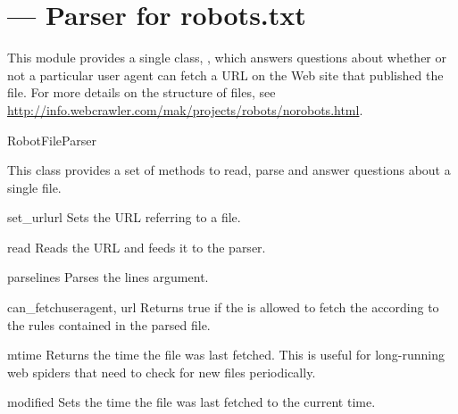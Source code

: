 \section{ --- 
         Parser for robots.txt}



This module provides a single class, , which answers
questions about whether or not a particular user agent can fetch a URL on
the Web site that published the  file.  For more details on 
the structure of  files, see
\url{http://info.webcrawler.com/mak/projects/robots/norobots.html}. 

\begin{classdesc}{RobotFileParser}{}

This class provides a set of methods to read, parse and answer questions
about a single  file.

\begin{methoddesc}{set_url}{url}
Sets the URL referring to a  file.
\end{methoddesc}

\begin{methoddesc}{read}{}
Reads the  URL and feeds it to the parser.
\end{methoddesc}

\begin{methoddesc}{parse}{lines}
Parses the lines argument.
\end{methoddesc}

\begin{methoddesc}{can_fetch}{useragent, url}
Returns true if the  is allowed to fetch the 
according to the rules contained in the parsed  file.
\end{methoddesc}

\begin{methoddesc}{mtime}{}
Returns the time the  file was last fetched.  This is
useful for long-running web spiders that need to check for new
 files periodically.
\end{methoddesc}

\begin{methoddesc}{modified}{}
Sets the time the  file was last fetched to the current
time.
\end{methoddesc}

\end{classdesc}

